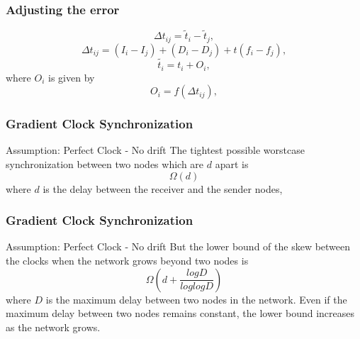 \documentclass[t]{beamer}
\begin{document}
\begin{frame}
    \frametitle{Adjusting the error}
\begin{equation}
\Delta t_{ij} = \tilde t_i  - \tilde t_j  ,
\end{equation}
\newline
\begin{equation}
 \Delta t_{ij} = (I_i - I_j) + (D_i-D_j) + t(f_i - f_j) ,
\end{equation}
\newline
\begin{equation}
\tilde{t_i} = t_i + O_i ,
\end{equation}
\newline
where $O_i$ is given by \newline
\begin{equation}
O_i = f(\Delta t_{ij}) ,
\end{equation}
\end{frame}
\begin{frame}
\begin{figure}[ht]
\end{figure}
\end{frame}
\begin{frame}
 \frametitle{Gradient Clock Synchronization}
  Assumption: Perfect Clock - No drift \newline \newline
  The tightest possible worstcase synchronization between two nodes which are $d$ apart is
  \begin{equation}
   \Omega(d)
  \end{equation}
  where \newline
  $d$ is the delay between the receiver and the sender nodes,\newline
  \newline
\end{frame}
\begin{frame}
 \frametitle{Gradient Clock Synchronization}
  Assumption: Perfect Clock - No drift \newline \newline
  But the lower bound of the skew between the clocks when the network grows beyond two nodes is
  \begin{equation}
   \Omega(d + \frac{logD}{loglogD})
  \end{equation}
\newline
  where \newline \newline
  $D$ is the maximum delay between two nodes in the network. \newline
  \newline
  Even if the maximum delay between two nodes remains constant, the lower bound increases as the network grows.
\end{frame}
\end{document}
